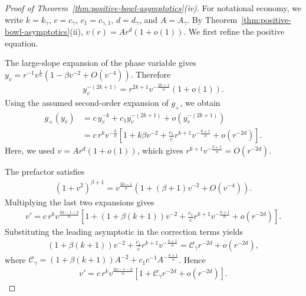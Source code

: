 \documentclass{amsart}
\theoremstyle{plain}
\theoremstyle{mainintrothm}
\theoremstyle{definition}
\begin{document}
	\begin{proof}[Proof of Theorem~\ref{thm:positive-bowl-asymptotics}\textup{(iv)}]
		For notational economy, we write $k=k_\gamma$, $c=c_\gamma$, $c_1=c_{\gamma,1}$,
		$d=d_\gamma$, and $A=A_\gamma$.  By
		Theorem~\ref{thm:positive-bowl-asymptotics}\textup{(ii)},
		$v(r)=Ar^d(1+o(1))$.  We first refine the positive equation.
		
		\medskip
		
		The large-slope expansion of the phase variable gives $y_v=r^{-1}v^{\frac{1}{\alpha}}
			\left(1-\beta v^{-2}+O(v^{-4})\right)$. Therefore
		\begin{align*}
			y_v^{-(2k+1)}
			=
			r^{2k+1}v^{-\frac{2k+1}{\alpha}}(1+o(1)).
		\end{align*}
		Using the assumed second-order expansion of $g_+$, we obtain
		\begin{align*}
			g_+(y_v)
			&=
			c\,y_v^{-k}
			+
			c_1y_v^{-(2k+1)}
			+
			o(y_v^{-(2k+1)}) \\
			&=
			c\,r^k v^{-\frac{k}{\alpha}}
			\left[
			1
			+
			k\beta v^{-2}
			+
			\frac{c_1}{c}r^{k+1}v^{-\frac{k+1}{\alpha}}
			+
			o(r^{-2d})
			\right].
		\end{align*}
		Here, we used $v=Ar^d(1+o(1))$, which gives
		$r^{k+1}v^{-\frac{k+1}{\alpha}}=O(r^{-2d})$.
		
		\medskip
		
		The prefactor satisfies
		\begin{align*}
			(1+v^2)^{\beta+1}
			=
			v^{\frac{3\alpha-1}{\alpha}}
			\left(1+(\beta+1)v^{-2}+O(v^{-4})\right).
		\end{align*}
		Multiplying the last two expansions gives
		\begin{align}
			\label{eq:second-order-degenerate-refined-ode}
			v'
			=
			c\,r^k v^{\frac{3\alpha-1-k}{\alpha}}
			\left[
			1
			+
			(1+\beta(k+1))v^{-2}
			+
			\frac{c_1}{c}r^{k+1}v^{-\frac{k+1}{\alpha}}
			+
			o(r^{-2d})
			\right].
		\end{align}
		Substituting the leading asymptotic in the correction terms yields
		\begin{align*}
			(1+\beta(k+1))v^{-2}
			+
			\frac{c_1}{c}r^{k+1}v^{-\frac{k+1}{\alpha}}
			=
			\mathcal C_\gamma r^{-2d}
			+
			o(r^{-2d}),
		\end{align*}
		where $\mathcal C_\gamma=(1+\beta(k+1))A^{-2}+c_1c^{-1}A^{-\frac{k+1}{\alpha}}$. Hence
		\begin{align}
			\label{eq:second-order-degenerate-reduced-ode}
			v'
			=
			c\,r^k v^{\frac{3\alpha-1-k}{\alpha}}
			\left[
			1+\mathcal C_\gamma r^{-2d}+o(r^{-2d})
			\right].
		\end{align}
		

\end{proof}
\end{document}
